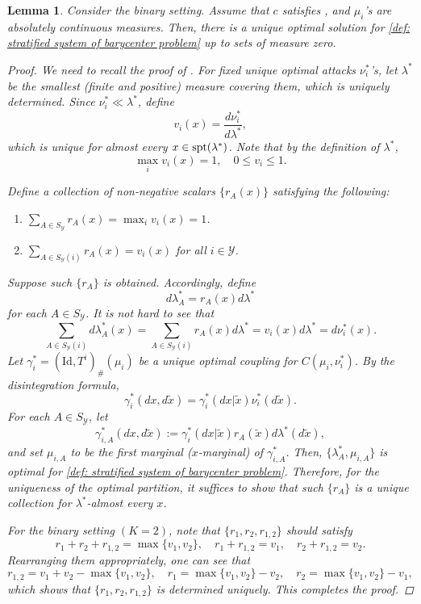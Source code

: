 \documentclass{amsart}
\theoremstyle{plain}
\numberwithin{equation}{section}\newtheorem{theorem}{Theorem}[section]
\newtheorem{lemma}[theorem]{Lemma}
\theoremstyle{remark}
\newcommand{\spt}{\textup{spt}}
\begin{document}
\begin{lemma}\label{lem: unique partition}
Consider the binary setting. Assume that $c$ satisfies , and $\mu_i$'s are absolutely continuous measures. Then, there is a unique optimal solution for \eqref{def: stratified system of barycenter problem} up to sets of measure zero.



\begin{proof}
We need to recall the proof of \cite[Proposition 11]{jakwang_MOT}. For fixed unique optimal attacks $\nu^*_i$'s, let $\lambda^*$ be the smallest (finite and positive) measure covering them, which is uniquely determined. Since $\nu^*_i \ll \lambda^*$, define
\[
    v_i(x) = \frac{d\nu^*_i}{d \lambda^*},
\]
which is unique for almost every $x \in \spt(\lambda^*)$. Note that by the definition of $\lambda^*$,
\[
    \max_{i} v_i(x) = 1, \quad 0 \leq v_i \leq 1.
\]


Define a collection of non-negative scalars $\{r_A(x)\}$ satisfying the following:
\begin{enumerate}
    \item $\sum_{A \in S_\mathcal{Y}} r_A(x) = \max_i v_i(x) = 1$.
    \item $\sum_{A \in S_\mathcal{Y}(i)} r_A(x) = v_i(x)$ for all $i \in \mathcal{Y}$.
\end{enumerate}
Suppose such $\{r_A\}$ is obtained. Accordingly, define
\[
    d\lambda^*_A = r_A(x) d \lambda^*
\]
for each $A \in S_\mathcal{Y}$. It is not hard to see that
\[
    \sum_{A \in S_\mathcal{Y}(i)} d\lambda^*_A(x) =  \sum_{A \in S_\mathcal{Y}(i)} r_A(x) d \lambda^* = v_i(x) d \lambda^* = d \nu^*_i(x).
\]
Let $\gamma^*_i = (\mathrm{Id}, T^i)_\# (\mu_i)$ be a unique optimal coupling for $C(\mu_i,\nu^*_i)$. By the disintegration formula,
\[
    \gamma^*_i(dx, d\tilde{x}) = \gamma^*_i(dx |\tilde{x}) \nu^*_i(d\tilde{x}).
\]
For each $A\in S_\mathcal{Y}$, let
\[
    \gamma^*_{i,A}(dx, d\tilde{x}):= \gamma^*_i(dx |\tilde{x}) r_A(\tilde{x}) d \lambda^*(d \tilde{x}),
\]
and set $\mu_{i, A}$ to be the first marginal ($x$-marginal) of $\gamma^*_{i,A}$. Then, $\{\lambda^*_A, \mu_{i,A}\}$ is optimal for \eqref{def: stratified system of barycenter problem}. Therefore, for the uniqueness of the optimal partition, it suffices to show that such $\{r_A\}$ is a unique collection for $\lambda^*$-almost every $x$.




For the binary setting $(K=2)$, note that $\{r_1, r_2, r_{1,2}\}$ should satisfy
\[
    r_1 + r_2 + r_{1,2} = \max\{v_1, v_2\}, \quad r_1 + r_{1,2}=v_1, \quad  r_2 + r_{1,2} = v_2.
\]
Rearranging them appropriately, one can see that
\[
    r_{1,2} = v_1 + v_2 -\max\{v_1, v_2\}, \quad r_1 = \max\{v_1, v_2\} - v_2, \quad r_2 = \max\{v_1, v_2\} - v_1,
\]
which shows that $\{r_1, r_2, r_{1,2}\}$ is determined uniquely. This completes the proof.
\end{proof}
\end{lemma}
\end{document}
